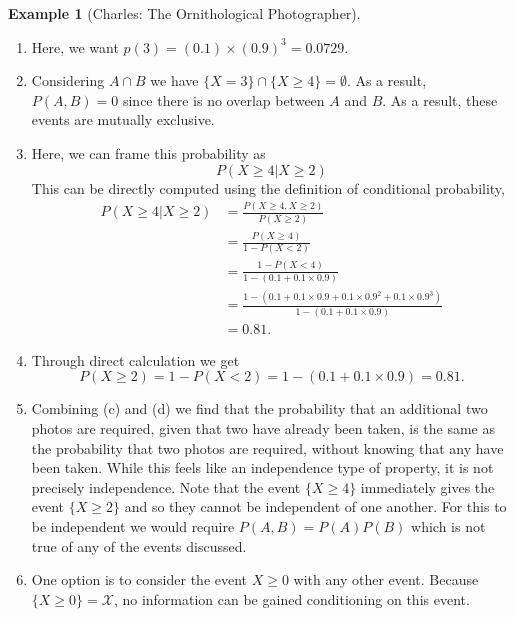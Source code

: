 \documentclass[
  letterpaper,
  DIV=11,
  numbers=noendperiod]{scrreprt}
\theoremstyle{definition}
\theoremstyle{definition}
\theoremstyle{definition}
\newtheorem{example}{Example}[chapter]
\theoremstyle{remark}
\begin{document}
\begin{example}[Charles: The Ornithological
Photographer]
\begin{tcolorbox}[enhanced jigsaw, colback=white, breakable, rightrule=.15mm, leftrule=.75mm, toprule=.15mm, left=2mm, arc=.35mm, opacityback=0, bottomrule=.15mm]
\begin{enumerate}
\def\labelenumi{\alph{enumi}.}
\item
  Here, we want \(p(3) = (0.1)\times(0.9)^3 = 0.0729\).
\item
  Considering \(A \cap B\) we have
  \(\{X = 3\} \cap \{X \geq 4\} = \emptyset\). As a result,
  \(P(A,B) = 0\) since there is no overlap between \(A\) and \(B\). As a
  result, these events are mutually exclusive.
\item
  Here, we can frame this probability as \[P(X \geq 4 | X \geq 2)\] This
  can be directly computed using the definition of conditional
  probability, \begin{align*}
   P(X \geq 4 | X \geq 2) &= \frac{P(X \geq 4, X \geq 2)}{P(X \geq 2)} \\
   &= \frac{P(X \geq 4)}{1 - P(X < 2)} \\
   &= \frac{1 - P(X < 4)}{1 - (0.1 + 0.1\times0.9)} \\
   &= \frac{1 - (0.1 + 0.1\times 0.9 + 0.1\times 0.9^2 + 0.1\times0.9^3)}{1 - (0.1 + 0.1\times 0.9)} \\
   &= 0.81.
  \end{align*}
\item
  Through direct calculation we get
  \[P(X \geq 2) = 1 - P(X < 2) = 1 - (0.1 + 0.1\times 0.9) = 0.81.\]
\item
  Combining (c) and (d) we find that the probability that an additional
  two photos are required, given that two have already been taken, is
  the same as the probability that two photos are required, without
  knowing that any have been taken. While this feels like an
  independence type of property, it is not precisely independence. Note
  that the event \(\{X \geq 4\}\) immediately gives the event
  \(\{X \geq 2\}\) and so they cannot be independent of one
  another.\footnotemark{} For this to be independent we would require
  \(P(A,B) = P(A)P(B)\) which is not true of any of the events
  discussed.
\item
  One option is to consider the event \(X \geq 0\) with any other event.
  Because \(\{X \geq 0\} = \mathcal{X}\), no information can be gained
  conditioning on this event.
\end{enumerate}

\end{tcolorbox}


\end{example}
\end{document}
